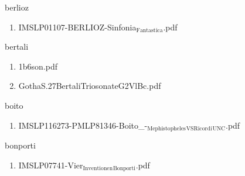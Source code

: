 \documentclass[11pt]{article}
\begin{document}
\item berlioz
\label{sec-1-1-1-1-44-11}
\begin{enumerate}
\item IMSLP01107-BERLIOZ-Sinfonia$_{\text{Fantastica}}$.pdf
\label{sec-1-1-1-1-44-11-1}
\end{enumerate}

\item bertali
\label{sec-1-1-1-1-44-12}
\begin{enumerate}
\item 1b6son.pdf
\label{sec-1-1-1-1-44-12-1}

\item GothaS.27BertaliTriosonateG2VlBc.pdf
\label{sec-1-1-1-1-44-12-2}
\end{enumerate}

\item boito
\label{sec-1-1-1-1-44-13}
\begin{enumerate}
\item IMSLP116273-PMLP81346-Boito\_-$_{\text{Mephistopheles}}$$_{\text{VSRicordi}}$$_{\text{UNC}}$.pdf
\label{sec-1-1-1-1-44-13-1}
\end{enumerate}

\item bonporti
\label{sec-1-1-1-1-44-14}
\begin{enumerate}
\item IMSLP07741-Vier$_{\text{Inventionen}}$$_{\text{Bonporti}}$.pdf
\label{sec-1-1-1-1-44-14-1}
\end{enumerate}
\end{document}
